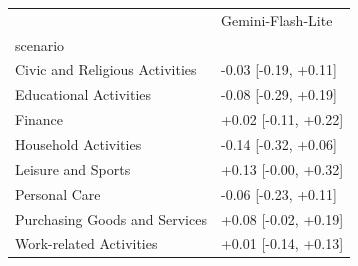 \begin{tabular}{ll}
\toprule
 & Gemini-Flash-Lite \\
scenario &  \\
\midrule
Civic and Religious Activities & -0.03 [-0.19, +0.11] \\
Educational Activities & -0.08 [-0.29, +0.19] \\
Finance & +0.02 [-0.11, +0.22] \\
Household Activities & -0.14 [-0.32, +0.06] \\
Leisure and Sports & +0.13 [-0.00, +0.32] \\
Personal Care & -0.06 [-0.23, +0.11] \\
Purchasing Goods and Services & +0.08 [-0.02, +0.19] \\
Work-related Activities & +0.01 [-0.14, +0.13] \\
\bottomrule
\end{tabular}
